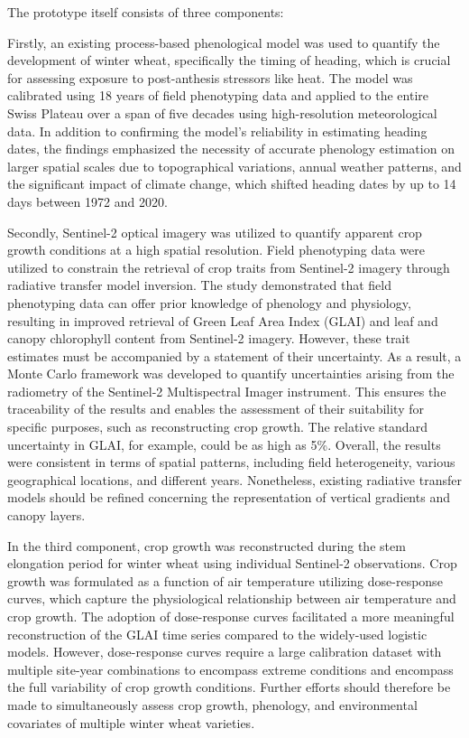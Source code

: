 The prototype itself consists of three components:

Firstly, an existing process-based phenological model was used to quantify the development of winter wheat, specifically the timing of heading, which is crucial for assessing exposure to post-anthesis stressors like heat. The model was calibrated using 18 years of field phenotyping data and applied to the entire Swiss Plateau over a span of five decades using high-resolution meteorological data. In addition to confirming the model's reliability in estimating heading dates, the findings emphasized the necessity of accurate phenology estimation on larger spatial scales due to topographical variations, annual weather patterns, and the significant impact of climate change, which shifted heading dates by up to 14 days between 1972 and 2020.

Secondly, Sentinel-2 optical imagery was utilized to quantify apparent crop growth conditions at a high spatial resolution. Field phenotyping data were utilized to constrain the retrieval of crop traits from Sentinel-2 imagery through radiative transfer model inversion. The study demonstrated that field phenotyping data can offer prior knowledge of phenology and physiology, resulting in improved retrieval of Green Leaf Area Index (GLAI) and leaf and canopy chlorophyll content from Sentinel-2 imagery. However, these trait estimates must be accompanied by a statement of their uncertainty. As a result, a Monte Carlo framework was developed to quantify uncertainties arising from the radiometry of the Sentinel-2 Multispectral Imager instrument. This ensures the traceability of the results and enables the assessment of their suitability for specific purposes, such as reconstructing crop growth. The relative standard uncertainty in GLAI, for example, could be as high as 5\%. Overall, the results were consistent in terms of spatial patterns, including field heterogeneity, various geographical locations, and different years. Nonetheless, existing radiative transfer models should be refined concerning the representation of vertical gradients and canopy layers.

In the third component, crop growth was reconstructed during the stem elongation period for winter wheat using individual Sentinel-2 observations. Crop growth was formulated as a function of air temperature utilizing dose-response curves, which capture the physiological relationship between air temperature and crop growth. The adoption of dose-response curves facilitated a more meaningful reconstruction of the GLAI time series compared to the widely-used logistic models. However, dose-response curves require a large calibration dataset with multiple site-year combinations to encompass extreme conditions and encompass the full variability of crop growth conditions. Further efforts should therefore be made to simultaneously assess crop growth, phenology, and environmental covariates of multiple winter wheat varieties. 

